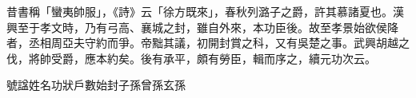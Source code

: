 
\begin{pinyinscope}
昔書稱「蠻夷帥服」，《詩》云「徐方既來」，春秋列潞子之爵，許其慕諸夏也。漢興至于孝文時，乃有弓高、襄城之封，雖自外來，本功臣後。故至孝景始欲侯降者，丞相周亞夫守約而爭。帝黜其議，初開封賞之科，又有吳楚之事。武興胡越之伐，將帥受爵，應本約矣。後有承平，頗有勞臣，輯而序之，續元功次云。

號諡姓名功狀戶數始封子孫曾孫玄孫


\end{pinyinscope}